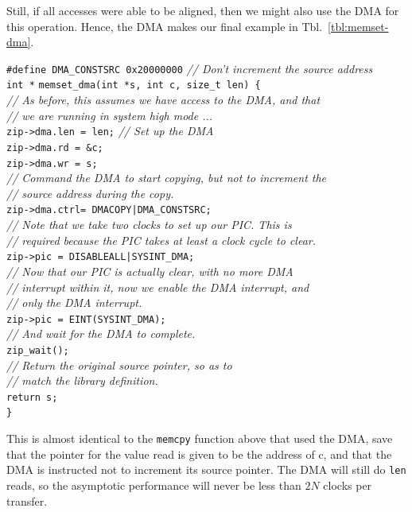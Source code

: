 \documentclass{gqtekspec}
\begin{document}
Still, if all accesses were able to be aligned, then we might also use the
DMA for this operation.  Hence, the DMA makes our final example in
Tbl.~\ref{tbl:memset-dma}.
\begin{table}\begin{center}
\begin{tabbing}
{\tt \#define DMA\_CONSTSRC 0x20000000} {\em // Don't increment the source address}
\\
{\tt int *} \= {\tt memset\_dma(int *s, int c, size\_t len) \{} \\
	\> {\em // As before, this assumes we have access to the DMA, and that}\\
	\> {\em // we are running in system high mode ...}\\
	\> {\tt zip->dma.len = len;} \= {\em // Set up the DMA }\\
	\> {\tt zip->dma.rd  = \&c;}\\
	\> {\tt zip->dma.wr  = s;}\\
	\> {\em // Command the DMA to start copying, but not to increment the} \\
	\> {\em // source address during the copy.} \\
	\> {\tt zip->dma.ctrl= DMACOPY|DMA\_CONSTSRC;} \\
	\> {\em // Note that we take two clocks to set up our PIC.  This is }\\
	\> {\em // required because the PIC takes at least a clock cycle to clear.} \\
	\> {\tt zip->pic = DISABLEALL|SYSINT\_DMA;} \\
	\> {\em // Now that our PIC is actually clear, with no more DMA }\\
	\> {\em // interrupt within it, now we enable the DMA interrupt, and}\\
	\> {\em // only the DMA interrupt.}\\
	\> {\tt zip->pic = EINT(SYSINT\_DMA);}\\
	\> {\em // And wait for the DMA to complete.} \\
	\> {\tt zip\_wait();}\\
	\> {\em // Return the original source pointer, so as to} \\
	\> {\em // match the library definition.} \\
	\> {\tt return s;}\\
{\tt \}}
\end{tabbing}
\caption{Example Memset code, only this time with the DMA}\label{tbl:memset-dma}
\end{center}\end{table}
This is almost identical to the {\tt memcpy} function above that used the
DMA, save that the pointer for the value read is given to be the address
of c, and that the DMA is instructed not to increment its source pointer.
The DMA will still do {\tt len} reads, so the asymptotic performance will never
be less than $2N$ clocks per transfer.
\end{document}
